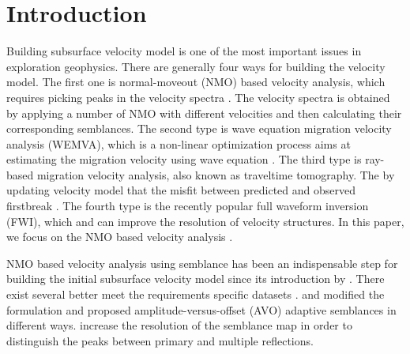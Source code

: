 \section{Introduction}
Building  subsurface velocity model is one of the most important issues in exploration geophysics. There are generally four ways for building the velocity model. The first one is normal-moveout (NMO) based velocity analysis, which requires picking peaks in the velocity spectra \cite[]{taner2009,fomel20091,luosimon2012}. The velocity spectra is obtained by applying a number of NMO  with different velocities and then calculating their corresponding semblances. The second type  is  wave equation  migration velocity analysis (WEMVA), which is a non-linear optimization process  aims at estimating the migration velocity using  wave equation   \cite[]{sava20041,sava20042,siwei2013}. %
The third type is ray-based migration velocity analysis, also known as traveltime tomography. The  by updating  velocity model  that the misfit between predicted and observed first\new{-}break   \cite[]{zhu1992,osypov2000,noble2010,siwei20131,jianxiong2013}. The fourth type is the recently popular full waveform inversion (FWI), which  \cite[]{virieux2009,antoine2012,honbo2012} and  can improve the resolution of velocity structures. %
In this paper, we focus on the NMO based velocity analysis .

NMO based velocity analysis using  semblance  has been an indispensable step for building the initial subsurface velocity model since its introduction by \cite{taner2009}. There exist several    better meet the requirements  specific datasets \cite[]{fomel20091,sarkar2001,luosimon2012}. \cite{sarkar2001} and \cite{fomel20091} modified the  formulation and proposed amplitude-versus-offset (AVO) adaptive semblances in different ways. \cite{luosimon2012} increase the resolution of the semblance map in order to distinguish the peaks between primary and multiple reflections.


